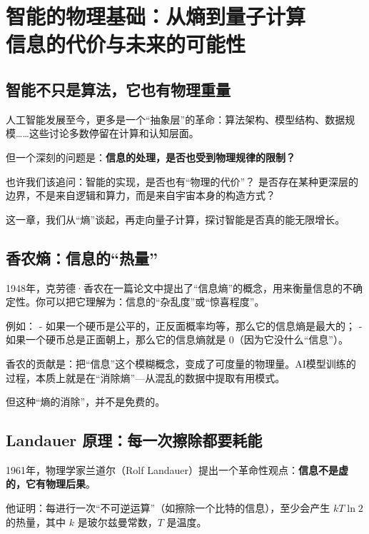 \chapter{智能的物理基础：从熵到量子计算\texorpdfstring{\\}{ }信息的代价与未来的可能性}


\section*{智能不只是算法，它也有物理重量}

人工智能发展至今，更多是一个“抽象层”的革命：算法架构、模型结构、数据规模……这些讨论多数停留在计算和认知层面。

但一个深刻的问题是：\textbf{信息的处理，是否也受到物理规律的限制？}

也许我们该追问：智能的实现，是否也有“物理的代价”？  
是否存在某种更深层的边界，不是来自逻辑和算力，而是来自宇宙本身的构造方式？

这一章，我们从“熵”谈起，再走向量子计算，探讨智能是否真的能无限增长。

\section*{香农熵：信息的“热量”}

1948年，克劳德·香农在一篇论文中提出了“信息熵”的概念，用来衡量信息的不确定性。你可以把它理解为：信息的“杂乱度”或“惊喜程度”。

例如：
- 如果一个硬币是公平的，正反面概率均等，那么它的信息熵是最大的；
- 如果一个硬币总是正面朝上，那么它的信息熵就是 0（因为它没什么“信息”）。

香农的贡献是：把“信息”这个模糊概念，变成了可度量的物理量。AI模型训练的过程，本质上就是在“消除熵”---从混乱的数据中提取有用模式。

但这种“熵的消除”，并不是免费的。

\section*{Landauer 原理：每一次擦除都要耗能}

1961年，物理学家兰道尔（Rolf Landauer）提出一个革命性观点：\textbf{信息不是虚的，它有物理后果}。

他证明：每进行一次“不可逆运算”（如擦除一个比特的信息），至少会产生 $kT\ln2$ 的热量，其中 $k$ 是玻尔兹曼常数，$T$ 是温度。

